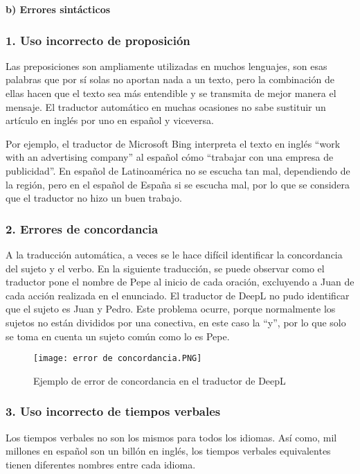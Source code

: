 \documentclass[conference]{IEEEtran}
\begin{document}
 \textbf{b) Errores sintácticos}

 \subsubsection*{1. Uso incorrecto de proposición}
 
Las preposiciones son ampliamente utilizadas en muchos lenguajes, son esas palabras que por sí solas no aportan nada a un texto, pero la combinación de ellas hacen que el texto sea más entendible y se transmita de mejor manera el mensaje. El traductor automático en muchas ocasiones no sabe sustituir un artículo en inglés por uno en español y viceversa.

Por ejemplo, el traductor de Microsoft Bing interpreta el texto en inglés “work with an advertising company” al español cómo “trabajar con una empresa de publicidad”. En español de Latinoamérica no se escucha tan mal, dependiendo de la región, pero en el español de España si se escucha mal, por lo que se considera que el traductor no hizo un buen trabajo.

\subsubsection*{2. Errores de concordancia} A la traducción automática, a veces se le hace difícil identificar la concordancia del sujeto y el verbo. En la siguiente traducción, se puede observar como el traductor pone el nombre de Pepe al inicio de cada oración, excluyendo a Juan de cada acción realizada en el enunciado. El traductor de DeepL no pudo identificar que el sujeto es Juan y Pedro. Este problema ocurre, porque normalmente los sujetos no están divididos por una conectiva, en este caso la “y”, por lo que solo se toma en cuenta un sujeto común como lo es Pepe.

\begin{figure}[htp]
        \centering
        \texttt{[image: error de concordancia.PNG]}
        \label{foto}
        \caption{Ejemplo de error de concordancia en el traductor de DeepL}
    \end{figure}
\subsubsection*{3. Uso incorrecto de tiempos verbales}
Los tiempos verbales no son los mismos para todos los idiomas. Así como, mil millones en español son un billón en inglés, los tiempos verbales equivalentes tienen diferentes nombres entre cada idioma.
\end{document}
